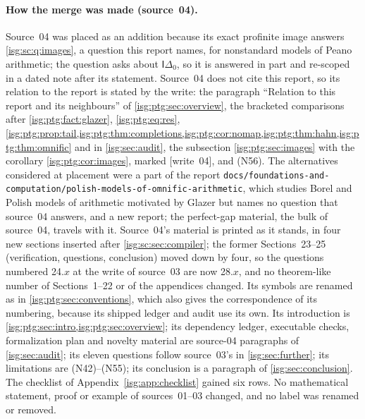 \documentclass[11pt]{article}
\theoremstyle{definition}
\theoremstyle{remark}
\newcommand{\Idelta}{\mathsf{I}\Delta_0}
\begin{document}
\paragraph{How the merge was made (source~04).} Source~04 was placed as an
addition because its exact profinite image answers \cref{isg:sc:q:images},
a question this report names, for nonstandard models of Peano arithmetic;
the question asks about $\Idelta$, so it is answered in part and re-scoped
in a dated note after its statement. Source~04 does not cite this report,
so its relation to the report is stated by the write: the paragraph
``Relation to this report and its neighbours'' of
\cref{isg:ptg:sec:overview}, the bracketed comparisons after
\cref{isg:ptg:fact:glazer}, \eqref{isg:ptg:eq:res},
\cref{isg:ptg:prop:tail,isg:ptg:thm:completions,isg:ptg:cor:nomap,isg:ptg:thm:hahn,isg:ptg:thm:omnific}
and in \cref{isg:sec:audit}, the subsection \cref{isg:ptg:sec:images} with
the corollary \cref{isg:ptg:cor:images}, marked \textup{[write~04]}, and
(N56). The alternatives considered at placement were a part of the report
\nolinkurl{docs/foundations-and-computation/polish-models-of-omnific-arithmetic},
which studies Borel and Polish models of arithmetic motivated by Glazer
but names no question that source~04 answers, and a new report; the
perfect-gap material, the bulk of source~04, travels with it. Source~04's
material is printed as it stands, in four new sections inserted after
\cref{isg:sc:sec:compiler}; the former Sections~23--25 (verification,
questions, conclusion) moved down by four, so the questions numbered 24.$x$
at the write of source~03 are now 28.$x$, and no theorem-like number of
Sections~1--22 or of the appendices changed. Its symbols are renamed as in
\cref{isg:ptg:sec:conventions}, which also gives the correspondence of its
numbering, because its shipped ledger and audit use its own. Its
introduction is \cref{isg:ptg:sec:intro,isg:ptg:sec:overview}; its
dependency ledger, executable checks, formalization plan and novelty
material are source-04 paragraphs of \cref{isg:sec:audit}; its eleven
questions follow source~03's in \cref{isg:sec:further}; its limitations are
(N42)--(N55); its conclusion is a paragraph of \cref{isg:sec:conclusion}.
The checklist of Appendix~\ref{isg:app:checklist} gained six rows. No
mathematical statement, proof or example of sources~01--03 changed, and no
label was renamed or removed.
\end{document}
